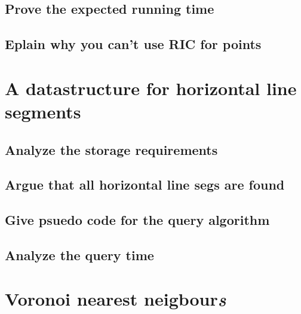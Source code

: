 \documentclass{article}
\begin{document}
\subsection{Prove the expected running time}


\subsection{Eplain why you can't use RIC for points}
\section{A datastructure for horizontal line segments}

\subsection{Analyze the storage requirements}
\subsection{Argue that all horizontal line segs are found}
\subsection{Give psuedo code for the query algorithm}

\subsection{Analyze the query time}

\section{Voronoi nearest neigbour\emph{s}}
\end{document}
